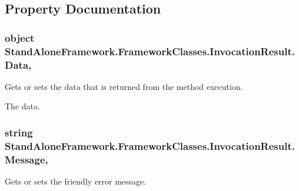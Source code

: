\subsection{Property Documentation}
\hypertarget{class_stand_alone_framework_1_1_framework_classes_1_1_invocation_result_a3cd591d332da9a4149dfa2444cec747e}{
\subsubsection[{Data}]{\setlength{\rightskip}{0pt plus 5cm}object Stand\+Alone\+Framework.\+Framework\+Classes.\+Invocation\+Result.\+Data\hspace{0.3cm}{\ttfamily [get]}, {\ttfamily [set]}}}\label{class_stand_alone_framework_1_1_framework_classes_1_1_invocation_result_a3cd591d332da9a4149dfa2444cec747e}


Gets or sets the data that is returned from the method execution. 

The data.\hypertarget{class_stand_alone_framework_1_1_framework_classes_1_1_invocation_result_a901421598cda8841d37a774865e7d037}{
\subsubsection[{Message}]{\setlength{\rightskip}{0pt plus 5cm}string Stand\+Alone\+Framework.\+Framework\+Classes.\+Invocation\+Result.\+Message\hspace{0.3cm}{\ttfamily [get]}, {\ttfamily [set]}}}\label{class_stand_alone_framework_1_1_framework_classes_1_1_invocation_result_a901421598cda8841d37a774865e7d037}


Gets or sets the friendly error message. 

